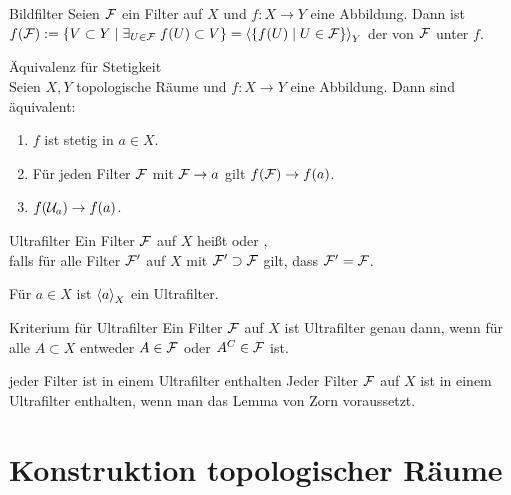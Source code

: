 \begin{Def}{Bildfilter}
    Seien $\mathcal{F}$ ein Filter auf $X$ und $f\colon X \rightarrow Y$ eine
    Abbildung.
    Dann ist \\
    $f(\mathcal{F}) := \{V \subset Y \;|\;
    \exists_{U \in \mathcal{F}}\; f(U) \subset V\} =
    \left\langle{\{f(U) \;|\; U \in \ensuremath{\mathcal{F}}\}}\right\rangle_Y$
    der  von $\mathcal{F}$ unter $f$.
\end{Def}

\begin{Satz}{Äquivalenz für Stetigkeit}\\
    Seien $X, Y$ topologische Räume und $f\colon X \rightarrow Y$ eine
    Abbildung.
    Dann sind äquivalent:
    \begin{enumerate}
        \item
        $f$ ist stetig in $a \in X$.

        \item
        Für jeden Filter $\mathcal{F}$ mit $\mathcal{F} \to a$ gilt $f(\mathcal{F}) \to f(a)$.

        \item
        $f(\mathcal{U}_a) \to f(a)$.
    \end{enumerate}
\end{Satz}

\linie

\begin{Def}{Ultrafilter}
    Ein Filter $\mathcal{F}$ auf $X$ heißt  oder
    , \\
    falls für alle Filter $\mathcal{F}'$ auf $X$ mit $\mathcal{F}' \supset \mathcal{F}$ gilt,
    dass $\mathcal{F}' = \mathcal{F}$.
\end{Def}

\begin{Bsp}
    Für $a \in X$ ist $\left\langle{a}\right\rangle_X$ ein Ultrafilter.
\end{Bsp}

\begin{Satz}{Kriterium für Ultrafilter}
    Ein Filter $\mathcal{F}$ auf $X$ ist Ultrafilter genau dann, wenn für alle
    $A \subset X$ entweder $A \in \mathcal{F}$ oder $A^C \in \mathcal{F}$ ist.
\end{Satz}

\begin{Satz}{jeder Filter ist in einem Ultrafilter enthalten}
    Jeder Filter $\mathcal{F}$ auf $X$ ist in einem Ultrafilter enthalten,
    wenn man das Lemma von Zorn voraussetzt.
\end{Satz}

\pagebreak

\section{%
    Konstruktion topologischer Räume%
}

